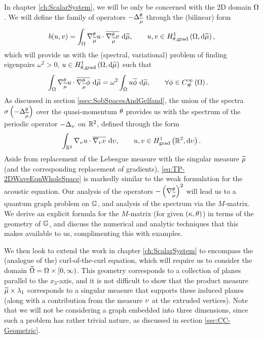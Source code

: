 In chapter \ref{ch:ScalarSystem}, we will be only be concerned with the 2D domain $\Omega$.
We will define the family of operators $-\Delta_{\widetilde{\mu}}^{\theta}$ through the (bilinear) form 
\begin{align*}
	b(u,v) = \int_{\Omega} \nabla^{\theta}_{\widetilde{\mu}} u\cdot\overline{\nabla^{\theta}_{\widetilde{\mu}} v}  \ \mathrm{d}\widetilde{\mu},
	\qquad u,v\in H^1_{\theta, \mathrm{grad}}\left( \Omega, \mathrm{d}\widetilde{\mu} \right),
\end{align*}
which will provide us with the (spectral, variational) problem of finding eigenpairs $\omega^2>0$, $u\in H^1_{\theta, \mathrm{grad}}\left( \Omega, \mathrm{d}\widetilde{\mu} \right)$ such that
\begin{align*}
	\int_{\Omega} \nabla^{\theta}_{\widetilde{\mu}} u\cdot\overline{\nabla^{\theta}_{\widetilde{\mu}}\phi}  \ \mathrm{d}\widetilde{\mu}
	&= \omega^2\int_{\Omega} u\overline{\phi}  \ \mathrm{d}\widetilde{\mu},
	\qquad\forall\phi\in C^{\infty}_{\#}\left( \Omega \right).
\end{align*}
As discussed in section \ref{ssec:SobSpacesAndGelfand}, the union of the spectra $\sigma\left( -\Delta_{\widetilde{\mu}}^{\theta} \right)$ over the quasi-momentum $\theta$ provides us with the spectrum of the periodic operator $-\Delta_{\upsilon}$ on $\mathbb{R}^2$, defined through the form
\begin{align} \label{eq:TP-2DWaveEqnWholeSpace}
	\int_{\mathbb{R}^2} \nabla_{\upsilon} u\cdot\overline{\nabla_{\upsilon} v}  \ \mathrm{d}\upsilon,
	\qquad u,v\in H^1_\mathrm{grad}\left( \mathbb{R}^2, \mathrm{d}\upsilon \right).
\end{align}
Aside from replacement of the Lebesgue measure with the singular measure $\widetilde{\mu}$ (and the corresponding replacement of gradients), \eqref{eq:TP-2DWaveEqnWholeSpace} is markedly similar to the weak formulation for the acoustic equation.
Our analysis of the operators $-\left( \nabla^{\theta}_{\widetilde{\mu}} \right)^2$ will lead us to a quantum graph problem on $\mathbb{G}$, and analysis of the spectrum via the $M$-matrix.
We derive an explicit formula for the $M$-matrix (for given $\left( \kappa, \theta \right)$) in terms of the geometry of $\mathbb{G}$, and discuss the numerical and analytic techniques that this makes available to us, complimenting this with examples.

We then look to extend the work in chapter \ref{ch:ScalarSystem} to encompass the (analogue of the) curl-of-the-curl equation, which will require us to consider the domain $\widetilde{\Omega} = \Omega\times[0,\infty)$.
This geometry corresponds to a collection of planes parallel to the $x_3$-axis, and it is not difficult to show that the product measure $\widetilde{\mu}\times\lambda_1$ corresponds to a singular measure that supports these induced planes (along with a contribution from the measure $\nu$ at the extruded vertices).
Note that we will not be considering a graph embedded into three dimensions, since such a problem has rather trivial nature, as discussed in section \ref{sec:CC-Geometric}.

